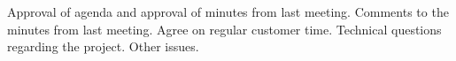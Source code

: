 \nextItem Approval of agenda and approval of minutes from last meeting.
\nextItem Comments to the minutes from last meeting.
\nextItem Agree on regular customer time.
\nextItem Technical questions regarding the project.
\nextItem Other issues.
